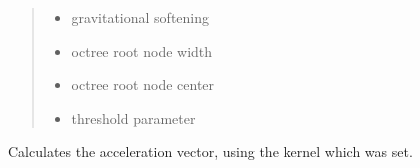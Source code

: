 \documentclass[letterpaper,10pt,english]{sphinxmanual}
\begin{document}
\begin{itemize}
\begin{fulllineitems}
\begin{fulllineitems}
\begin{quote}
\begin{description}
\begin{itemize}
\item {} 
\sphinxAtStartPar
{} \textendash{} gravitational softening

\item {} 
\sphinxAtStartPar
{} \textendash{} octree root node width

\item {} 
\sphinxAtStartPar
{} \textendash{} octree root node center

\item {} 
\sphinxAtStartPar
{} \textendash{} threshold parameter

\end{itemize}

\end{description}\end{quote}

\end{fulllineitems}


\begin{fulllineitems}
\label{\detokenize{simulator:nbody.simulator.simulation.BHSimulation.calc_accs}}
\sphinxAtStartPar
Calculates the acceleration vector, using the kernel which was set.

\end{fulllineitems}


\end{fulllineitems}


\end{itemize}
\end{document}

